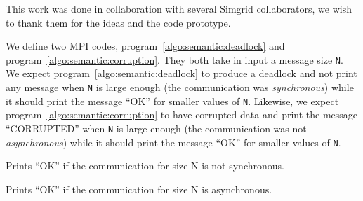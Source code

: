             This work was done in collaboration with several Simgrid collaborators, we wish to thank them for the ideas
            and the code prototype.

            We define two MPI codes, program~\ref{algo:semantic:deadlock} and program~\ref{algo:semantic:corruption}.
            They both take in input a message size \texttt{N}. We expect program~\ref{algo:semantic:deadlock} to produce
            a deadlock and not print any message when \texttt{N} is large enough (the communication was
            \emph{synchronous}) while it should print the message ``OK'' for smaller values of \texttt{N}. Likewise, we
            expect program~\ref{algo:semantic:corruption} to have corrupted data and print the message ``CORRUPTED''
            when \texttt{N} is large enough (the communication was not \emph{asynchronous}) while it should print the
            message ``OK'' for smaller values of \texttt{N}.
            \begin{algorithm}
                \DontPrintSemicolon
                \caption{Prints ``OK'' if the communication for size N is not synchronous.}
                \label{algo:semantic:deadlock}
            \end{algorithm}

            \begin{algorithm}
                \DontPrintSemicolon
                \caption{Prints ``OK'' if the communication for size N is asynchronous.}
                \label{algo:semantic:corruption}
            \end{algorithm}

